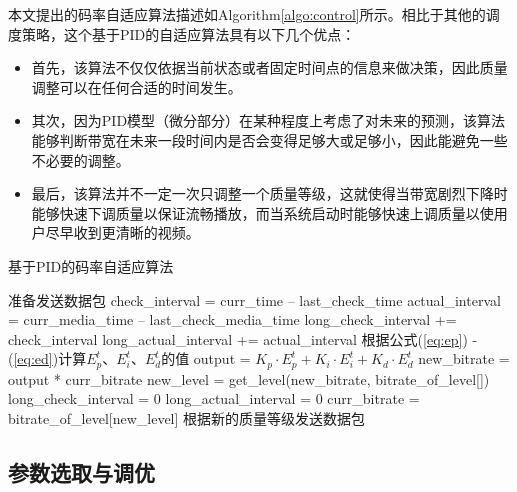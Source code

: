 本文提出的码率自适应算法描述如Algorithm\ref{algo:control}所示。相比于其他的调度策略，这个基于PID的自适应算法具有以下几个优点：
\begin{itemize}
	\item 首先，该算法不仅仅依据当前状态或者固定时间点的信息来做决策，因此质量调整可以在任何合适的时间发生。
	\vspace{10pt}
	\item 其次，因为PID模型（微分部分）在某种程度上考虑了对未来的预测，该算法能够判断带宽在未来一段时间内是否会变得足够大或足够小，因此能避免一些不必要的调整。
	\vspace{10pt}
	\item 最后，该算法并不一定一次只调整一个质量等级，这就使得当带宽剧烈下降时能够快速下调质量以保证流畅播放，而当系统启动时能够快速上调质量以使用户尽早收到更清晰的视频。
	\vspace{10pt}
\end{itemize}

\begin{algorithm}
	\vspace{10pt}
	\caption{基于PID的码率自适应算法}
	\label{algo:control}
	\begin{algorithmic}
		\STATE 准备发送数据包
		\STATE check\_interval = curr\_time -- last\_check\_time
		\STATE actual\_interval = curr\_media\_time -- last\_check\_media\_time
		\STATE long\_check\_interval += check\_interval
		\STATE long\_actual\_interval += actual\_interval
		\STATE 根据公式(\ref{eq:ep}) - (\ref{eq:ed})计算$E_p^t$、$E_i^t$、$E_d^t$的值
		\STATE output = ${K_p} \cdot E_p^t + {K_i} \cdot E_i^t + {K_d} \cdot E_d^t$
		\STATE new\_bitrate = output * curr\_bitrate
		\STATE new\_level = get\_level(new\_bitrate, bitrate\_of\_level[])
		\STATE long\_check\_interval = 0
		\STATE long\_actual\_interval = 0
		\STATE curr\_bitrate = bitrate\_of\_level[new\_level]
		\ENDIF
		\STATE 根据新的质量等级发送数据包
	\end{algorithmic}
	\vspace{10pt}
\end{algorithm}

\subsection{参数选取与调优}


